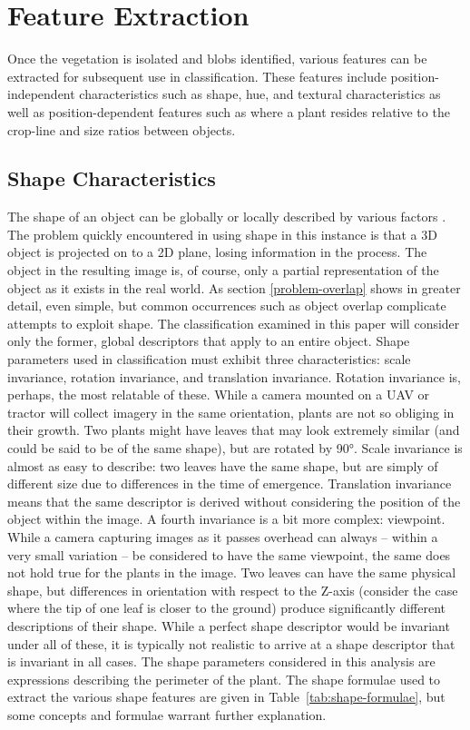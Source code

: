 \documentclass[letterpaper]{article}
\begin{document}
{{\section{Feature Extraction}
Once the vegetation is isolated and blobs identified, various features can be extracted for subsequent use in classification. These features include position-independent characteristics such as shape, hue, and textural characteristics as well as position-dependent features such as where a plant resides relative to the crop-line and size ratios between objects.  

\subsection{Shape Characteristics}
The shape of an object can be globally or locally described by various factors \parencite{Zhang2004-cm}. The problem quickly encountered in using shape in this instance is that a 3D object is projected on to a 2D plane, losing information in the process. The object in the resulting image is, of course, only a partial representation of the object as it exists in the real world. As section \ref{problem-overlap} shows in greater detail, even simple, but common occurrences such as object overlap complicate attempts to exploit shape. The classification examined in this paper will consider only the former, global descriptors that apply to an entire object. Shape parameters used in classification must exhibit three characteristics: scale invariance, rotation invariance, and translation invariance. Rotation invariance is, perhaps, the most relatable of these. While a camera mounted on a UAV or tractor will collect imagery in the same orientation, plants are not so obliging in their growth. Two plants might have leaves that may look extremely similar (and could be said to be of the same shape), but are rotated by 90\si{\degree}. Scale invariance is almost as easy to describe: two leaves have the same shape, but are simply of different size due to differences in the time of emergence. Translation invariance means that the same descriptor is derived without considering the position of the object within the image.  A fourth invariance is a bit more complex: viewpoint. While a camera capturing images as it passes overhead can always -- within a very small variation -- be considered to have the same viewpoint, the same does not hold true for the plants in the image. Two leaves can have the same physical shape, but differences in orientation with respect to the Z-axis (consider the case where the tip of one leaf is closer to the ground) produce significantly different descriptions of their shape. While a perfect shape descriptor would be invariant under all of these, it is typically not realistic to arrive at a shape descriptor that is invariant in all cases.
The shape parameters considered in this analysis are expressions describing the perimeter of the plant. The shape formulae used to extract the various shape features are given in Table~\ref{tab:shape-formulae}, but some concepts and formulae warrant further explanation.

}}
\end{document}

